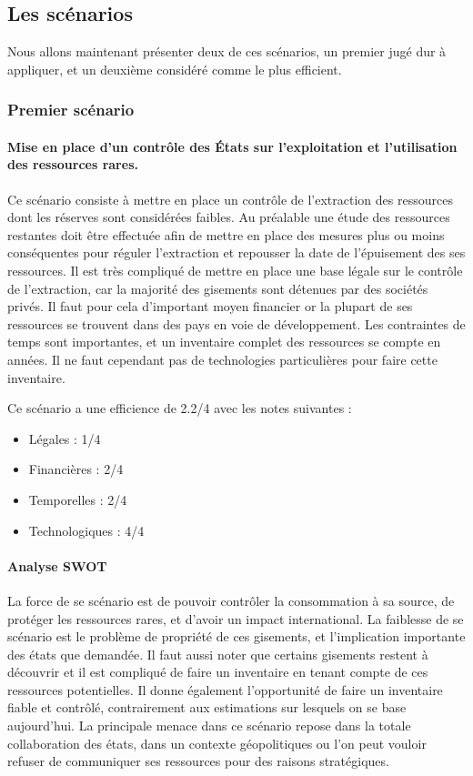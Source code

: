 \subsection{Les scénarios}

\smallbreak Nous allons maintenant présenter deux de ces scénarios, un premier jugé dur à appliquer, et un deuxième considéré comme le plus efficient.

\subsubsection{Premier scénario}    
\paragraph{Mise en place d’un contrôle des États sur l’exploitation et l’utilisation des ressources rares.}
\medbreak
Ce scénario consiste à mettre en place un contrôle de l’extraction des ressources dont les réserves sont considérées faibles. Au préalable une étude des ressources restantes doit être effectuée afin de mettre en place des mesures plus ou moins conséquentes pour réguler l’extraction et repousser la date de l’épuisement des ses ressources.
Il est très compliqué de mettre en place une base légale sur le contrôle de l’extraction, car la majorité des gisements sont détenues par des sociétés privés. 
Il faut pour cela d’important moyen financier or la plupart de ses ressources se trouvent dans des pays en voie de développement.
Les contraintes de temps sont importantes, et un inventaire complet des ressources se compte en années. 
Il ne faut cependant pas de technologies particulières pour faire cette inventaire.

Ce scénario a une efficience de 2.2/4 avec les notes suivantes :
\begin{itemize}
\item Légales : 1/4
\item Financières : 2/4
\item Temporelles : 2/4
\item Technologiques : 4/4
\end{itemize}


\paragraph{Analyse SWOT}

La force de se scénario est de pouvoir contrôler la consommation à sa source, de protéger les ressources rares, et d’avoir un impact international.
La faiblesse de se scénario est le problème de propriété de ces gisements, et l’implication importante des états que demandée. Il faut aussi noter que certains gisements restent à découvrir et il est compliqué de faire un inventaire en tenant compte de ces ressources potentielles.
Il donne également l’opportunité de faire un inventaire fiable et contrôlé, contrairement aux estimations sur lesquels on se base aujourd’hui.
\medbreak
La principale menace dans ce scénario repose dans la totale collaboration des états, dans un contexte géopolitiques ou l’on peut vouloir refuser de communiquer ses ressources pour des raisons stratégiques.


